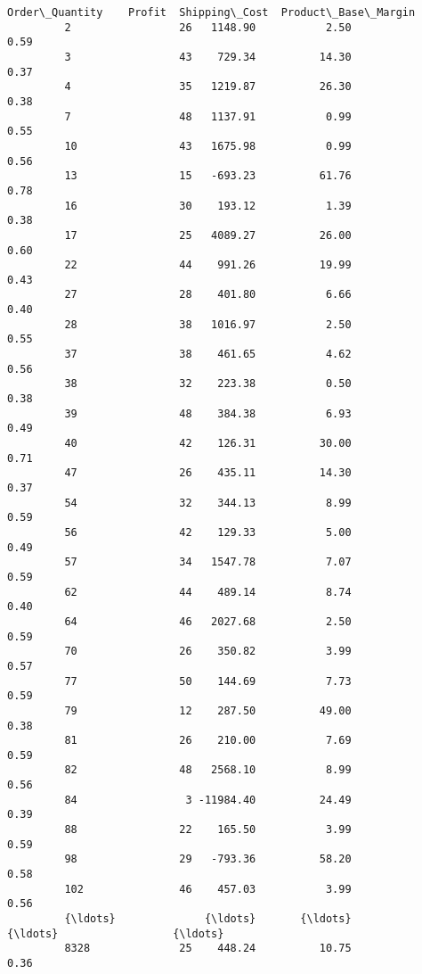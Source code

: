 \documentclass[11pt]{article}
\begin{document}
\begin{Verbatim}[commandchars=\\\{\}]
               Order\_Quantity    Profit  Shipping\_Cost  Product\_Base\_Margin  
         2                 26   1148.90           2.50                 0.59  
         3                 43    729.34          14.30                 0.37  
         4                 35   1219.87          26.30                 0.38  
         7                 48   1137.91           0.99                 0.55  
         10                43   1675.98           0.99                 0.56  
         13                15   -693.23          61.76                 0.78  
         16                30    193.12           1.39                 0.38  
         17                25   4089.27          26.00                 0.60  
         22                44    991.26          19.99                 0.43  
         27                28    401.80           6.66                 0.40  
         28                38   1016.97           2.50                 0.55  
         37                38    461.65           4.62                 0.56  
         38                32    223.38           0.50                 0.38  
         39                48    384.38           6.93                 0.49  
         40                42    126.31          30.00                 0.71  
         47                26    435.11          14.30                 0.37  
         54                32    344.13           8.99                 0.59  
         56                42    129.33           5.00                 0.49  
         57                34   1547.78           7.07                 0.59  
         62                44    489.14           8.74                 0.40  
         64                46   2027.68           2.50                 0.59  
         70                26    350.82           3.99                 0.57  
         77                50    144.69           7.73                 0.59  
         79                12    287.50          49.00                 0.38  
         81                26    210.00           7.69                 0.59  
         82                48   2568.10           8.99                 0.56  
         84                 3 -11984.40          24.49                 0.39  
         88                22    165.50           3.99                 0.59  
         98                29   -793.36          58.20                 0.58  
         102               46    457.03           3.99                 0.56  
         {\ldots}              {\ldots}       {\ldots}            {\ldots}                  {\ldots}  
         8328              25    448.24          10.75                 0.36  

\end{Verbatim}
\end{document}
